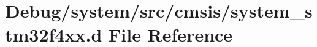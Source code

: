\hypertarget{system__stm32f4xx_8d}{}\section{Debug/system/src/cmsis/system\+\_\+stm32f4xx.d File Reference}
\label{system__stm32f4xx_8d}
